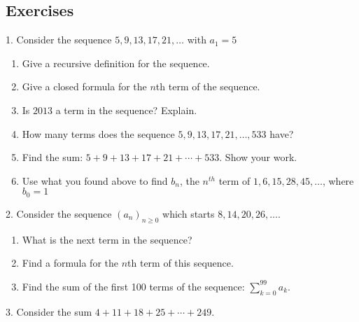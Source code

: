 \documentclass[10pt,]{book}
\theoremstyle{plain}
\theoremstyle{definition}
\numberwithin{equation}{chapter}
\begin{document}
\subsection[Exercises]{Exercises}\label{exercises_seq-arithgeom}
\begin{exerciselist}
\item[1.]\hypertarget{exercise-149}{}
        Consider the sequence \(5, 9, 13, 17, 21, \ldots\) with \(a_1 = 5\)
\leavevmode%
\begin{enumerate}[label=(\alph*)]
\item\hypertarget{li-504}{}
            Give a recursive definition for the sequence.
\item\hypertarget{li-505}{}
            Give a closed formula for the \(n\)th term of the sequence.
\item\hypertarget{li-506}{}
            Is \(2013\) a term in the sequence? Explain.
\item\hypertarget{li-507}{}
            How many terms does the sequence \(5, 9, 13, 17, 21, \ldots, 533\) have?
\item\hypertarget{li-508}{}
            Find the sum: \(5 + 9 + 13 + 17 + 21 + \cdots + 533\). Show your work.
\item\hypertarget{li-509}{}
            Use what you found above to find \(b_n\), the \(n^{th}\) term of \(1, 6, 15, 28, 45, \ldots\), where \(b_0 = 1\)
\end{enumerate}
\par\smallskip
\item[2.]\hypertarget{exercise-150}{}
              Consider the sequence \((a_n)_{n \ge 0}\) which starts \(8, 14, 20, 26, \ldots\).
\leavevmode%
\begin{enumerate}[label=(\alph*)]
\item\hypertarget{li-516}{}
                  What is the next term in the sequence?
\item\hypertarget{li-517}{}
                  Find a formula for the \(n\)th term of this sequence.
\item\hypertarget{li-518}{}
                  Find the sum of the first 100 terms of the sequence: \(\sum_{k=0}^{99}a_k\).
\end{enumerate}
\par\smallskip
\item[3.]\hypertarget{exercise-151}{}
              Consider the sum \(4 + 11 + 18 + 25 + \cdots + 249\).

\end{exerciselist}
\end{document}
